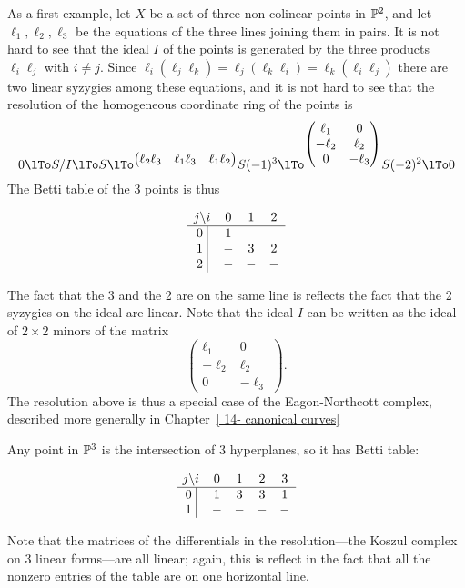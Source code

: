 \begin{example}\label{syzygies of points}
As a first example, let $X$ be a set of three non-colinear points in $\PP^2$, and let $\ell_1, \ell_2,\ell_3$ be the equations of the three
lines joining them in pairs. It is not hard to see that the ideal $I$ of the points is generated by the three products $\ell_i\ell_j$ with $i\neq j$. Since $ \ell_i(\ell_j\ell_k) = \ell_j(\ell_k\ell_i) = \ell_k(\ell_i\ell_j)$
there are two linear syzygies among these equations, and it is not hard to see that the resolution of the homogeneous coordinate ring of the points
is
$$
0\lTo S/I\lTo S
\lTo^{\begin{pmatrix}
\ell_2\ell_3&\ell_1\ell_3&\ell_1\ell_2
\end{pmatrix}}
 S(-1)^3
 \lTo^{\begin{pmatrix}
  \ell_1&0\\
  -\ell_2&\ell_2\\
 0&-\ell_3
 \end{pmatrix}}
 S(-2)^2
 \lTo 0
$$
The Betti table of the 3 points is thus
\begin{small}
$$
\begin{matrix}
j \backslash i     &0&1&2\\ \hline
\text{0 }\vline &1&-&-\\
\text{1 }\vline &-&3&2\\
\text{2 }\vline &-&-&-\\
\end{matrix}
$$
\end{small}
The fact that the 3 and the 2 are on the same line is reflects the fact that the 2 syzygies on the ideal are linear. Note that the
ideal $I$ can be written as the ideal of $2\times 2$ minors of the matrix
$$
 {\begin{pmatrix}
  \ell_1&0\\
  -\ell_2&\ell_2\\
 0&-\ell_3
 \end{pmatrix}}.
$$
The resolution above is thus a special case of the Eagon-Northcott complex, described more generally in Chapter~\ref{ 14- canonical curves}

\begin{example}[Points in $\PP^3$]
Any point in $\PP^3$ is the intersection of 3 hyperplanes, so it has Betti table:
\begin{small}
$$
\begin{matrix}
j \backslash i &0&1&2&3\\ \hline
\text{0 }\vline &1&3&3&1\\
\text{1 }\vline &-&-&-&-\\
\end{matrix}
$$
\end{small}
Note that the matrices of the differentials in the resolution---the Koszul complex on 3 linear forms---are all linear; again, this is reflect in the fact that all the 
nonzero entries of the table are on one horizontal line.


\end{example}
\end{example}
